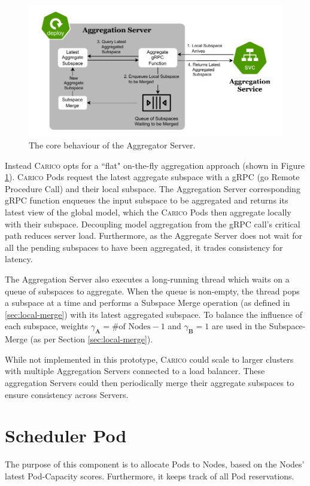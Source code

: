 \begin{figure}[ht!]
    \centering
    \includegraphics[width=\textwidth]{images/carico-agg.pdf}
    \caption{The core behaviour of the Aggregator Server.}
    \label{fig:spazio-agg-components}
\end{figure}

Instead \textsc{Carico} opts for a ``flat" on-the-fly aggregation approach
(shown in Figure \ref{fig:spazio-agg-components}).
\textsc{Carico} Pods request the latest aggregate subspace with a gRPC (go
Remote Procedure Call) and their local subspace. The Aggregation Server
corresponding gRPC function enqueues the input subspace to be aggregated and
returns its latest view of the global model, which the \textsc{Carico} Pods then
aggregate locally with their subspace. Decoupling model aggregation from the
gRPC call's critical path reduces server load. Furthermore, as the Aggregate
Server does not wait for all the pending subspaces to have been aggregated, it
trades consistency for latency.

The Aggregation Server also executes a long-running thread which waits on a
queue of subspaces to aggregate. When the queue is non-empty, the thread pops
a subspace at a time and performs a Subspace Merge operation (as defined in
\ref{sec:local-merge}) with its latest aggregated subspace. To balance the
influence of each subspace, weights $\gamma_{\mathbf{A}} = \text{\# of Nodes}
- 1$ and $\gamma_{\mathbf{B}} = 1$ are used in the Subspace-Merge (as per
Section \ref{sec:local-merge}).

While not implemented in this prototype, \textsc{Carico} could scale to larger
clusters with  multiple Aggregation Servers connected to a load balancer. These
aggregation Servers could then periodically merge their aggregate subspaces to
ensure consistency across Servers.

\section{Scheduler Pod}
The purpose of this component is to allocate Pods to Nodes, based on the Nodes'
latest Pod-Capacity scores. Furthermore, it keeps track of all Pod reservations.

